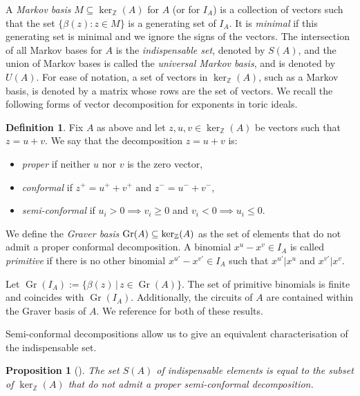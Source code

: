 \documentclass[a4paper, 12pt]{article}
\newcommand{\ZZ}{\mathbb Z}
\theoremstyle{plain}
\newtheorem{proposition}[theorem]{Proposition}
\theoremstyle{definition}
\newtheorem{definition}[theorem]{Definition}
\theoremstyle{remark}
\begin{document}
A \textit{Markov basis} $M \subseteq \ker_\ZZ(A)$ for $A$ (or for $I_A$) is a collection of vectors such that the set $\{\beta(z) : z \in M\}$ is a generating set of $I_A$. It is \textit{minimal} if this generating set is minimal and we ignore the signs of the vectors. The intersection of all Markov bases for $A$ is the \textit{indispensable set}, denoted by $S(A)$, and the union of Markov bases is called the \textit{universal Markov basis}, and is denoted by $U(A)$. For ease of notation, a set of vectors in $\ker_{\ZZ}(A)$, such as a Markov basis, is denoted by a matrix whose rows are the set of vectors. 
We recall the following forms of vector decomposition for exponents in toric ideals.

\begin{definition}\label{def: conformal and semi-conformal decomposition}
    Fix $A$ as above and let $z, u, v \in \ker_\ZZ(A)$ be vectors such that $z = u+v$. We say that the decomposition $z = u+v$ is:
    \begin{itemize}
        \item \textit{proper} if neither $u$ nor $v$ is the zero vector,
        \item \textit{conformal} if $ z^+=u^++ v^+ \text{ and } z^-=u^-+v^-$,
        \item \textit{semi-conformal} if $u_i > 0 \implies v_i \geq 0$ and $v_i < 0 \implies u_i \leq 0$.
    \end{itemize}
    We define the \textit{Graver basis} ${\rm Gr}(A) \subseteq \ker_\ZZ(A)$ as the set of elements that do not admit a proper conformal decomposition. 
    A binomial $x^u-x^v \in I_A$ is called \textit{primitive} if there is no other binomial $x^{u'}-x^{v'} \in I_A$ such that $x^{u'}|x^u$ and $x^{v'}|x^v$.
\end{definition}
Let $\operatorname{Gr}(I_A) := \{\beta(z) \,|\, z \in \operatorname{Gr}(A)\}$. The set of
primitive binomials is finite and coincides with $\operatorname{Gr}(I_A)$. Additionally, the circuits of $A$ are contained within the Graver basis of $A$. We reference \cite[Chapter 4]{sturmfels1996grobner} for both of these results.

Semi-conformal decompositions allow us to give an equivalent characterisation of the indispensable set.

\begin{proposition}[{\cite[Proposition~1.1]{charalambous2014markov}}]\label{prop: no semi-conformal decomp iff indispensable}
    The set $S(A)$ of indispensable elements is equal to the subset of $\ker_\ZZ(A)$ that do not admit a proper semi-conformal decomposition.
\end{proposition}
\end{document}
